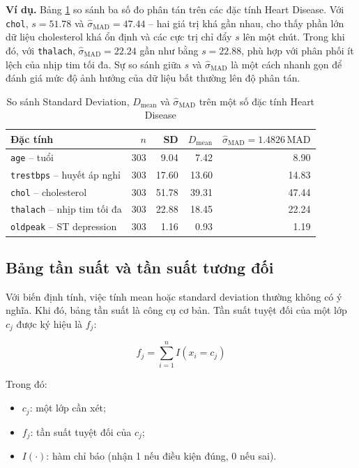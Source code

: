 \textbf{Ví dụ.} Bảng \ref{tab:chapter1_mad_median_example} so sánh ba số đo phân tán trên các đặc tính Heart Disease. Với \texttt{chol}, $s=51.78$ và $\hat{\sigma}_{\text{MAD}}=47.44$ -- hai giá trị khá gần nhau, cho thấy phần lớn dữ liệu cholesterol khá ổn định và các cực trị chỉ đẩy $s$ lên một chút. Trong khi đó, với \texttt{thalach}, $\hat{\sigma}_{\text{MAD}}=22.24$ gần như bằng $s=22.88$, phù hợp với phân phối ít lệch của nhịp tim tối đa. Sự so sánh giữa $s$ và $\hat{\sigma}_{\text{MAD}}$ là một cách nhanh gọn để đánh giá mức độ ảnh hưởng của dữ liệu bất thường lên độ phân tán.

\begin{table}[H]
\centering
\caption{So sánh Standard Deviation, $D_{\text{mean}}$ và $\hat{\sigma}_{\text{MAD}}$ trên một số đặc tính Heart Disease}
\label{tab:chapter1_mad_median_example}
\small
\begin{tabular}{lrrrr}
\toprule
Đặc tính & $n$ & SD & $D_{\text{mean}}$ & $\hat{\sigma}_{\text{MAD}}=1.4826\,\text{MAD}$ \\
\midrule
\texttt{age} -- tuổi & 303 & 9.04 & 7.42 & 8.90 \\
\texttt{trestbps} -- huyết áp nghỉ & 303 & 17.60 & 13.60 & 14.83 \\
\texttt{chol} -- cholesterol & 303 & 51.78 & 39.31 & 47.44 \\
\texttt{thalach} -- nhịp tim tối đa & 303 & 22.88 & 18.45 & 22.24 \\
\texttt{oldpeak} -- ST depression & 303 & 1.16 & 0.93 & 1.19 \\
\bottomrule
\end{tabular}
\end{table}

\subsection{Bảng tần suất và tần suất tương đối}

Với biến định tính, việc tính mean hoặc standard deviation thường không có ý nghĩa. Khi đó, bảng tần suất là công cụ cơ bản. Tần suất tuyệt đối của một lớp $c_j$ được ký hiệu là $f_j$:

\begin{equation}
f_j = \sum_{i=1}^{n} I(x_i = c_j)
\end{equation}

Trong đó:
\begin{itemize}[leftmargin=1.6em,label=\textbullet]
 \item $c_j$: một lớp cần xét;
 \item $f_j$: tần suất tuyệt đối của $c_j$;
 \item $I(\cdot)$: hàm chỉ báo (nhận 1 nếu điều kiện đúng, 0 nếu sai).
\end{itemize}

